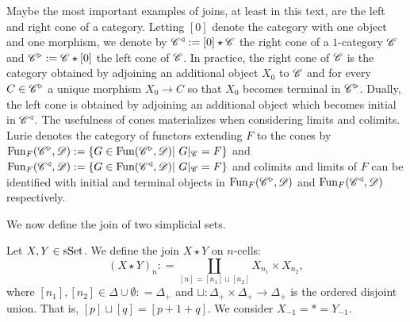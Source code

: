 \documentclass[../../thesis.tex]{subfiles}
\begin{document}
\begin{example}
    Maybe the most important examples of joins, at least in this text, are the left and right cone of a category.
    Letting $[0]$ denote the category with one object and one morphism, we denote by $\mathscr{C}^{\triangleleft}: = [0] \star \mathscr{C}$ the right cone of a $1$-category $\mathscr{C}$ and $\mathscr{C}^{\triangleright}:=\mathscr{C} \star [0]$ the left cone of $\mathscr{C}$.
    In practice, the right cone of $\mathscr{C}$ is the category obtained by adjoining an additional object $X_0$ to $\mathscr{C}$ and for every $C \in \mathscr{C}^{\triangleright}$ a unique morphism $X_0 \to C$ so that $X_0$ becomes terminal in $\mathscr{C}^{\triangleright}$.
    Dually, the left cone is obtained by adjoining an additional object which becomes initial in $\mathscr{C}^{\triangleleft}$.
    \newline
    The usefulness of cones materializes when considering limits and colimits.
    Lurie denotes the category of functors extending $F$ to the cones by $\Fun_F(\C^{\triangleright}, \D) : = \{G \in \Fun(\C^{\triangleright}, \D) | G|_{\C} = F\}$ and $\Fun_F(\C^{\triangleleft}, \D): = \{G \in \Fun(\C^{\triangleleft}, \D) | G|_{\C} = F\}$ and colimits and limits of $F$ can be identified with initial and terminal objects in $\mathrm{Fun}_F(\mathscr{C}^{\triangleright}, \mathscr{D})$ and $\mathrm{Fun}_F(\mathscr{C}^{\triangleleft}, \mathscr{D})$ respectively.
\end{example}
We now define the join of two simplicial sets.
\begin{definition}
    Let $X, Y \in \mathrm{sSet}$.
    We define the join $X\star Y$ on $n$-cells:
    \[
        (X\star Y)_n : = \coprod_{[n] = [n_1] \sqcup [n_2]} X_{n_1} \times X_{n_2},
    \]
    where $[n_1], [n_2] \in \Delta \cup \emptyset : = \Delta_+$ and $\sqcup: \Delta_+ \times \Delta_+ \to \Delta_+$ is the ordered disjoint union.
    That is, $[p] \sqcup [q] = [p+1+q]$.
    We consider $X_{-1} = * = Y_{-1}$.
\end{definition}
\end{document}
